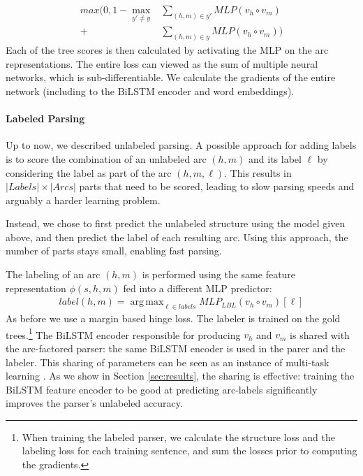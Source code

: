 \documentclass[11pt]{article}
\DeclareMathOperator*{\argmax}{arg\,max}
\begin{document}
\begin{align*}
max\Big(0, 1 - \max_{y' \neq y}&\sum_{(h,m) \in y'}{MLP(v_h \circ v_m)} \\
 +& \sum_{(h,m) \in y}{MLP(v_h \circ v_m)}\Big) 
\end{align*}
\noindent Each of the tree scores is then calculated by activating the MLP on the arc
representations. The entire loss can viewed as the sum of multiple neural
networks, which is sub-differentiable. We calculate the gradients of the entire
network (including to the \mbox{BiLSTM} encoder and word embeddings).

\paragraph{Labeled Parsing}
Up to now, we described unlabeled parsing. 
A possible approach for adding labels is to score the combination of an
unlabeled arc $(h,m)$ and its label $\ell$ by considering the label as part of the arc $(h,m,\ell)$.
This results in $|Labels| \times |Arcs|$ parts that need to be scored, leading
to slow parsing speeds and arguably a harder learning problem.

Instead, we chose to first predict the unlabeled structure using the model given
above, and then predict the label of each resulting arc.
Using this approach, the number of parts stays small, enabling fast parsing.

The labeling of an arc $(h,m)$ is performed using the same feature
representation $\phi(s,h,m)$ fed into a different MLP predictor:
\begin{align*}
    label(h,m) = \argmax_{\ell \in labels} MLP_{LBL}(v_h \circ v_m)[\ell]
\end{align*}
As before we use a margin based hinge loss.
The labeler is trained on the gold trees.\footnote{When training the labeled
parser, we calculate the structure loss and the labeling loss for each training
sentence, and sum the losses prior to computing the gradients.}
The \mbox{BiLSTM} encoder responsible for producing $v_h$ and $v_m$ is shared with the
arc-factored parser: the same \mbox{BiLSTM} encoder is used in the parer and the
labeler.  This
sharing of parameters can be seen as an instance of multi-task learning
\cite{Caruana:1997:ML:262868.262872}.
As we show in Section \ref{sec:results}, the sharing is effective: training the \mbox{BiLSTM} feature encoder to be good
at predicting arc-labels significantly improves the parser's unlabeled accuracy.
\end{document}

